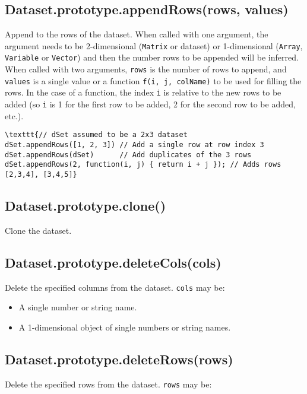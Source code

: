 \documentclass{article}
\begin{document}
    \subsection*{Dataset.prototype.appendRows(rows, values)}
    Append to the rows of the dataset.
When called with one argument, the argument needs to be 2-dimensional
(\texttt{Matrix} or dataset) or 1-dimensional (\texttt{Array}, \texttt{Variable} or \texttt{Vector}) and then
the number rows to be appended will be inferred.
When called with two arguments, \texttt{rows} is the number of rows to append, and \texttt{values}
is a single value or a function \texttt{f(i, j, colName)} to be used for filling the rows.
In the case of a function, the index \texttt{i} is relative to the new rows to be added
(so \texttt{i} is 1 for the first row to be added, 2 for the second row to be added, etc.).


\begin{lstlisting}
\texttt{// dSet assumed to be a 2x3 dataset
dSet.appendRows([1, 2, 3]) // Add a single row at row index 3
dSet.appendRows(dSet)      // Add duplicates of the 3 rows
dSet.appendRows(2, function(i, j) { return i + j }); // Adds rows [2,3,4], [3,4,5]}\end{lstlisting}

    \subsection*{Dataset.prototype.clone()}
    Clone the dataset.


    \subsection*{Dataset.prototype.deleteCols(cols)}
    Delete the specified columns from the dataset. \texttt{cols} may be:


\begin{itemize}

\item A single number or string name.

\item A 1-dimensional object of single numbers or string names.

\end{itemize}

    \subsection*{Dataset.prototype.deleteRows(rows)}
    Delete the specified rows from the dataset. \texttt{rows} may be:
\end{document}
